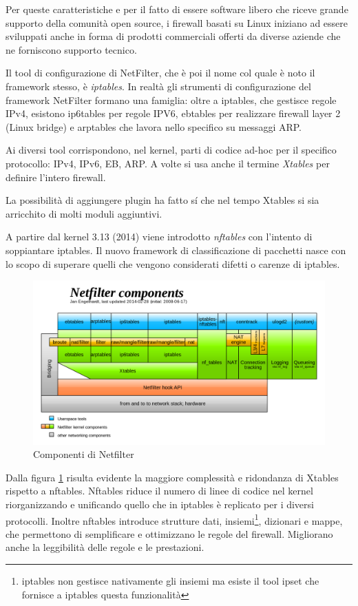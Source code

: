 Per queste caratteristiche e per il fatto di essere software libero che riceve
grande supporto della comunità open source, i firewall basati su Linux
iniziano ad essere sviluppati anche in forma di prodotti commerciali offerti
da diverse aziende che ne forniscono supporto tecnico.

Il tool di configurazione di NetFilter, che è poi il nome col quale è noto il
framework stesso, è {\em iptables}.
In realtà gli strumenti di configurazione del framework NetFilter formano una
famiglia: oltre a iptables, che gestisce regole IPv4, esistono ip6tables per
regole IPV6, ebtables per realizzare firewall layer 2 (Linux bridge)
e arptables che lavora nello specifico su messaggi ARP.

Ai diversi tool corrispondono, nel kernel, parti di codice ad-hoc per il
specifico protocollo: IPv4, IPv6, EB, ARP.  A volte si usa anche il termine
{\em Xtables} per definire l'intero firewall.

La possibilità di aggiungere plugin ha fatto s\'i che nel tempo Xtables si
sia arricchito di molti moduli aggiuntivi.

A partire dal kernel 3.13 (2014) viene introdotto {\em nftables} con l'intento
di soppiantare iptables.  Il nuovo framework di classificazione di pacchetti
nasce con lo scopo di superare quelli che vengono considerati difetti o
carenze di iptables.

\begin{figure}[H]
\begin{center}
      \includegraphics[width=\linewidth]{Netfilter-components.svg.png}
      \caption{Componenti di Netfilter}
      \label{fig:netfilter}
\end{center}
\end{figure}

Dalla figura \ref{fig:netfilter} risulta evidente la maggiore complessità e
ridondanza di Xtables rispetto a nftables.  Nftables riduce il numero di linee
di codice nel kernel riorganizzando e unificando quello che in iptables è
replicato per i diversi protocolli.  Inoltre nftables introduce strutture
dati, insiemi\footnote{iptables non gestisce nativamente gli insiemi ma esiste
il tool ipset che fornisce a iptables questa funzionalità}, dizionari e mappe,
che permettono di semplificare e ottimizzano le regole del firewall.
Migliorano anche la leggibilità delle regole e le prestazioni.

